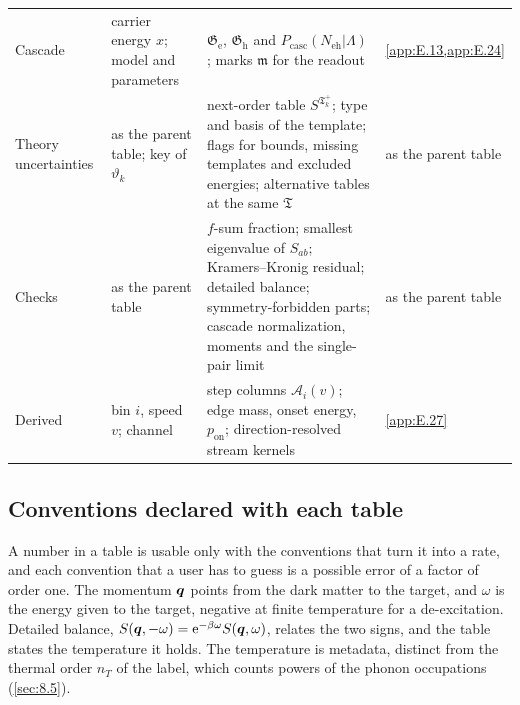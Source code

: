 \begin{table}[tbp]
\begin{tabular}{@{}>{\raggedright\arraybackslash}p{2.1cm}>{\raggedright\arraybackslash}p{2.8cm}>{\raggedright\arraybackslash}p{6.6cm}>{\raggedright\arraybackslash}p{2.5cm}@{}}
    Cascade & carrier energy $x$; model and parameters & $\mathfrak{G}_{\mathrm{e}}$, $\mathfrak{G}_{\mathrm{h}}$ and $P_{\mathrm{casc}}(N_{\mathrm{eh}}|\Lambda)$; marks $\mathfrak{m}$ for the readout & \cref{app:E.13,app:E.24} \\
    Theory uncertainties & as the parent table; key of $\vartheta_k$ & next-order table $S^{\mathfrak{T}_k^+}$; type and basis of the template; flags for bounds, missing templates and excluded energies; alternative tables at the same $\mathfrak{T}$ & as the parent table \\
    Checks & as the parent table & $f$-sum fraction; smallest eigenvalue of $S_{ab}$; Kramers--Kronig residual; detailed balance; symmetry-forbidden parts; cascade normalization, moments and the single-pair limit & as the parent table \\
    Derived & bin $i$, speed $v$; channel & step columns $\mathcal{A}_i(v)$; edge mass, onset energy, $p_{\mathrm{on}}$; direction-resolved stream kernels & \cref{app:E.27} \\
    \bottomrule
  \end{tabular}
\end{table}

\subsection{Conventions declared with each table}\label{sec:21.6-conventions}

A number in a table is usable only with the conventions that turn it into a rate, and each convention that a user has to guess is a possible error of a factor of order one. The momentum $\bm{q}$ points from the dark matter to the target, and $\omega$ is the energy given to the target, negative at finite temperature for a de-excitation. Detailed balance, $S(\bm{q},-\omega) = \mathrm{e}^{-\beta\omega}S(\bm{q},\omega)$, relates the two signs, and the table states the temperature it holds. The temperature is metadata, distinct from the thermal order $n_T$ of the label, which counts powers of the phonon occupations (\cref{sec:8.5}).

